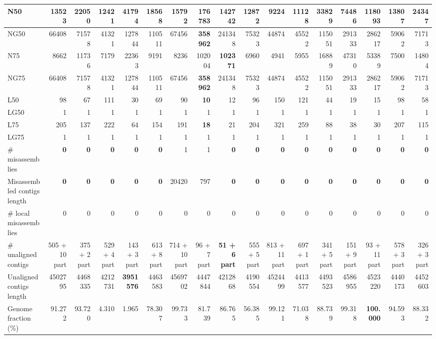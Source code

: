 \documentclass[12pt,a4paper]{article}
\begin{document}
\begin{table}[ht]
\begin{center}
\begin{tabular}{|l*{16}{|r}|}
N50 & 13523 & 22050 & 12421 & 41794 & 18568 & 15792 & {\bf 176783} & 142742 & 12872 & 9224 & 11128 & 33829 & 74486 & 118093 & 13807 & 24347 \\ \hline
NG50 & 66408 & 71578 & 41321 & 127844 & 110511 & 67456 & {\bf 358962} & 241348 & 75323 & 44874 & 45522 & 115051 & 291333 & 286217 & 59062 & 71713 \\ \hline
N75 & 8662 & 11736 & 7179 & 22363 & 9191 & 8236 & 102004 & {\bf 102371} & 6960 & 4941 & 5955 & 16889 & 47310 & 53389 & 7500 & 14804 \\ \hline
NG75 & 66408 & 71578 & 41321 & 127844 & 110511 & 67456 & {\bf 358962} & 241348 & 75323 & 44874 & 45522 & 115051 & 291333 & 286217 & 59062 & 71713 \\ \hline
L50 & 98 & 67 & 111 & 30 & 69 & 90 & {\bf 10} & 12 & 96 & 150 & 121 & 44 & 19 & 15 & 98 & 58 \\ \hline
LG50 & 1 & 1 & 1 & 1 & 1 & 1 & 1 & 1 & 1 & 1 & 1 & 1 & 1 & 1 & 1 & 1 \\ \hline
L75 & 205 & 137 & 222 & 64 & 154 & 191 & {\bf 18} & 21 & 204 & 321 & 259 & 88 & 38 & 30 & 207 & 115 \\ \hline
LG75 & 1 & 1 & 1 & 1 & 1 & 1 & 1 & 1 & 1 & 1 & 1 & 1 & 1 & 1 & 1 & 1 \\ \hline
\# misassemblies & {\bf 0} & {\bf 0} & {\bf 0} & {\bf 0} & {\bf 0} & 1 & 1 & {\bf 0} & {\bf 0} & {\bf 0} & {\bf 0} & {\bf 0} & {\bf 0} & {\bf 0} & {\bf 0} & {\bf 0} \\ \hline
Misassembled contigs length & {\bf 0} & {\bf 0} & {\bf 0} & {\bf 0} & {\bf 0} & 20420 & 797 & {\bf 0} & {\bf 0} & {\bf 0} & {\bf 0} & {\bf 0} & {\bf 0} & {\bf 0} & {\bf 0} & {\bf 0} \\ \hline
\# local misassemblies & 0 & 0 & 0 & 0 & 0 & 0 & 0 & 0 & 0 & 0 & 0 & 0 & 0 & 0 & 0 & 0 \\ \hline
\# unaligned contigs & 505 + 10 part & 375 + 2 part & 529 + 4 part & 143 + 3 part & 613 + 8 part & 714 + 10 part & 96 + 7 part & {\bf 51 + 6 part} & 555 + 5 part & 813 + 11 part & 697 + 1 part & 341 + 5 part & 151 + 9 part & 93 + 11 part & 578 + 3 part & 326 + 3 part \\ \hline
Unaligned contigs length & 4502795 & 4468335 & 4212731 & {\bf 3951576} & 4463583 & 4569702 & 4447844 & 4212868 & 4190554 & 4524499 & 4413577 & 4493523 & 4586955 & 4523220 & 4440173 & 4452603 \\ \hline
Genome fraction (\%) & 91.272 & 93.720 & 4.310 & 1.965 & 78.307 & 99.733 & 81.739 & 86.765 & 56.385 & 99.121 & 71.038 & 88.739 & 99.318 & {\bf 100.000} & 94.593 & 88.332 \\ \hline

\end{tabular}
\end{center}
\end{table}
\end{document}
